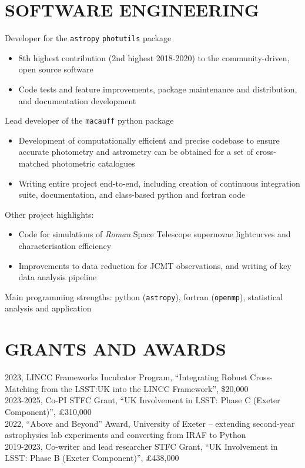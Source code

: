 \documentclass[letter, margin, 10pt]{res} %
\begin{document}
\begin{resume}
\section{SOFTWARE ENGINEERING}

Developer for the \texttt{astropy} \texttt{photutils} package
\begin{itemize}[noitemsep,topsep=0pt,parsep=0pt,partopsep=0pt]
\item 8th highest contribution (2nd highest 2018-2020) to the community-driven, open source software
\item Code tests and feature improvements, package maintenance and distribution, and documentation development
\end{itemize}
\vspace{-10pt}
Lead developer of the \texttt{macauff} python package
\begin{itemize}[noitemsep,topsep=0pt,parsep=0pt,partopsep=0pt]
\item Development of computationally efficient and precise codebase to ensure accurate photometry and astrometry can be obtained for a set of cross-matched photometric catalogues
\item Writing entire project end-to-end, including creation of continuous integration suite, documentation, and class-based python and fortran code
\end{itemize}
\vspace{-10pt}
Other project highlights:
\begin{itemize}[noitemsep,topsep=0pt,parsep=0pt,partopsep=0pt]
\item Code for simulations of \textit{Roman} Space Telescope supernovae lightcurves and characterisation efficiency
\item Improvements to data reduction for JCMT observations, and writing of key data analysis pipeline
\end{itemize}
\vspace{-10pt}
Main programming strengths: python (\texttt{astropy}), fortran (\texttt{openmp}), statistical analysis and application

\parskip 5pt
\vspace{-6pt}
\section{GRANTS AND AWARDS}
2023, LINCC Frameworks Incubator Program, ``Integrating Robust Cross-Matching from the LSST:UK into the LINCC Framework'', \$20,000\\
2023-2025, Co-PI STFC Grant, ``UK Involvement in LSST: Phase C (Exeter Component)'', £310,000\\
2022, ``Above and Beyond'' Award, University of Exeter -- extending second-year astrophysics lab experiments and converting from IRAF to Python\\
2019-2023, Co-writer and lead researcher STFC Grant, ``UK Involvement in LSST: Phase B (Exeter Component)'', £438,000


\end{resume}
\end{document}
